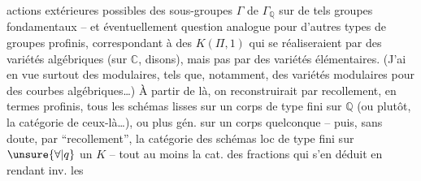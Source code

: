 actions extérieures possibles des sous-groupes $\Gamma$ de $\Gamma_{\mathbb{Q}}$ sur de tels groupes fondamentaux -- et éventuellement question analogue pour d'autres types de groupes profinis, correspondant à des $K(\Pi,1)$ qui se réaliseraient par des variétés algébriques (sur $\mathbb{C}$, disons), mais pas par des variétés élémentaires. (J'ai en vue surtout des   modulaires, tels que, notamment, des variétés modulaires pour des courbes algébriques\ldots) À partir de là, on reconstruirait par recollement, en termes profinis, tous les schémas lisses sur un corps de type fini sur $\mathbb{Q}$ (ou plutôt, la catégorie de ceux-là\ldots), ou plus gén. sur un corps quelconque -- puis, sans doute, par ``recollement'', la catégorie des schémas loc de type fini sur $\unsure{\forall|q}$ un $K$ -- tout au moins la cat. des fractions qui s'en déduit en  rendant inv. les
